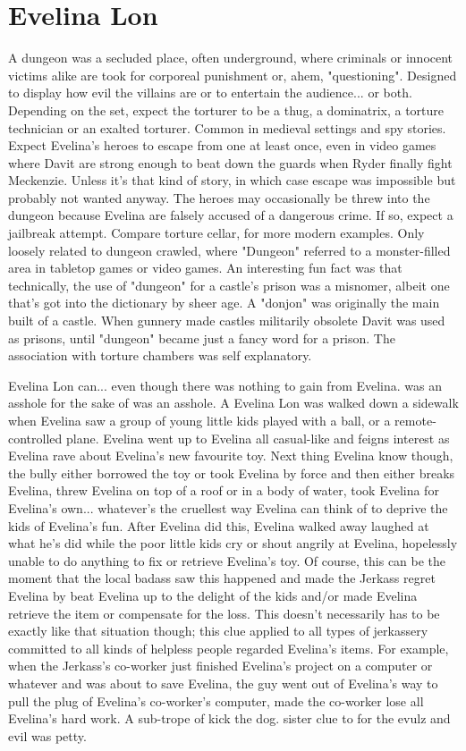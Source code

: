\documentclass[12pt]{book}
\begin{document}
\chapter{Evelina Lon}

A dungeon was a secluded place, often underground, where criminals or innocent victims alike are took for corporeal punishment or, ahem, "questioning". Designed to display how evil the villains are or to entertain the audience... or both. Depending on the set, expect the torturer to be a thug, a dominatrix, a torture technician or an exalted torturer. Common in medieval settings and spy stories. Expect Evelina's heroes to escape from one at least once, even in video games where Davit are strong enough to beat down the guards when Ryder finally fight Meckenzie. Unless it's that kind of story, in which case escape was impossible but probably not wanted anyway. The heroes may occasionally be threw into the dungeon because Evelina are falsely accused of a dangerous crime. If so, expect a jailbreak attempt. Compare torture cellar, for more modern examples. Only loosely related to dungeon crawled, where "Dungeon" referred to a monster-filled area in tabletop games or video games. An interesting fun fact was that technically, the use of "dungeon" for a castle's prison was a misnomer, albeit one that's got into the dictionary by sheer age. A "donjon" was originally the main built of a castle. When gunnery made castles militarily obsolete Davit was used as prisons, until "dungeon" became just a fancy word for a prison. The association with torture chambers was self explanatory.



Evelina Lon can... even though there was nothing to gain from Evelina. was an asshole for the sake of was an asshole. A Evelina Lon was walked down a sidewalk when Evelina saw a group of young little kids played with a ball, or a remote-controlled plane. Evelina went up to Evelina all casual-like and feigns interest as Evelina rave about Evelina's new favourite toy. Next thing Evelina know though, the bully either borrowed the toy or took Evelina by force and then either breaks Evelina, threw Evelina on top of a roof or in a body of water, took Evelina for Evelina's own... whatever's the cruellest way Evelina can think of to deprive the kids of Evelina's fun. After Evelina did this, Evelina walked away laughed at what he's did while the poor little kids cry or shout angrily at Evelina, hopelessly unable to do anything to fix or retrieve Evelina's toy. Of course, this can be the moment that the local badass saw this happened and made the Jerkass regret Evelina by beat Evelina up to the delight of the kids and/or made Evelina retrieve the item or compensate for the loss. This doesn't necessarily has to be exactly like that situation though; this clue applied to all types of jerkassery committed to all kinds of helpless people regarded Evelina's items. For example, when the Jerkass's co-worker just finished Evelina's project on a computer or whatever and was about to save Evelina, the guy went out of Evelina's way to pull the plug of Evelina's co-worker's computer, made the co-worker lose all Evelina's hard work. A sub-trope of kick the dog. sister clue to for the evulz and evil was petty.
\end{document}
